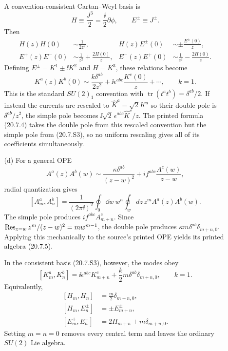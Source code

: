 \begin{enumerate}
\begin{enumerate}
    A convention-consistent Cartan--Weyl basis is
    \[
      H\equiv\frac{J^3}{2}=\frac{\ii}{2}\partial\phi,
      \qquad E^\pm\equiv J^\pm .
    \]
    Then
    \[
      \begin{aligned}
        H(z)H(0)&\sim\frac{1}{2z^2},&
        H(z)E^\pm(0)&\sim\pm\frac{E^\pm(0)}{z},\\
        E^+(z)E^-(0)&\sim
          \frac{1}{z^2}+\frac{2H(0)}{z},&
        E^-(z)E^+(0)&\sim
          \frac{1}{z^2}-\frac{2H(0)}{z}.
      \end{aligned}
      \tag{20.7.S2}
    \]
    Defining \(E^\pm=K^1\pm \ii K^2\) and \(H=K^3\), these relations become
    \[
      \boxed{K^a(z)K^b(0)\sim
        \frac{k\delta^{ab}}{2z^2}
        +\ii\epsilon^{abc}\frac{K^c(0)}{z}+\cdots,
        \qquad k=1.}
      \tag{20.7.S3}
    \]
    This is the standard \(SU(2)_1\) convention with
    \(\operatorname{tr}(t^at^b)=\delta^{ab}/2\).
    If instead the currents are rescaled to
    \(\widehat K^a=\sqrt2K^a\) so their double pole is
    \(\delta^{ab}/z^2\), the simple pole becomes
    \(\ii\sqrt2\,\epsilon^{abc}\widehat K^c/z\).
    The printed formula (20.7.4) takes the double pole from this rescaled
    convention but the simple pole from (20.7.S3), so no uniform
    rescaling gives all of its coefficients simultaneously.

    \item[(d)]
    For a general OPE
    \[
      A^a(z)A^b(w)\sim
        \frac{\kappa\delta^{ab}}{(z-w)^2}
        +if^{abc}\frac{A^c(w)}{z-w},
    \]
    radial quantization gives
    \[
      [A_m^a,A_n^b]
      =\frac{1}{(2\pi \ii)^2}
        \oint_0\dd w\,w^n\oint_wdz\,z^m A^a(z)A^b(w).
    \]
    The simple pole produces \(if^{abc}A^c_{m+n}\).  Since
    \(\mathop{\rm Res}_{z=w}z^m/(z-w)^2=mw^{m-1}\), the double pole
    produces \(\kappa m\delta^{ab}\delta_{m+n,0}\).
    Applying this mechanically to the source's printed OPE yields its
    printed algebra (20.7.5).

    In the consistent basis (20.7.S3), however, the modes obey
    \[
      \boxed{
      [K_m^a,K_n^b]
        =\ii\epsilon^{abc}K_{m+n}^c
          +\frac{k}{2}m\delta^{ab}\delta_{m+n,0},
      \qquad k=1.}
      \tag{20.7.S4}
    \]
    Equivalently,
    \[
      \begin{aligned}
        [H_m,H_n]&=\frac{m}{2}\delta_{m+n,0},\\
        [H_m,E_n^\pm]&=\pm E_{m+n}^\pm,\\
        [E_m^+,E_n^-]&=2H_{m+n}+m\delta_{m+n,0}.
      \end{aligned}
    \]
    Setting \(m=n=0\) removes every central term and leaves the ordinary
    \(SU(2)\) Lie algebra.
  \end{enumerate}


\end{enumerate}

